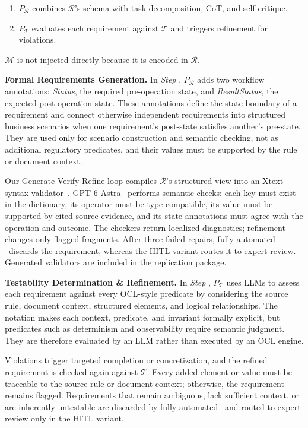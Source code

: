 \begin{enumerate}[leftmargin=*,align=left, itemsep=0pt, parsep=0pt, nosep]
    \item $P_\mathcal{R}$ combines $\mathcal{R}$'s schema with task
    decomposition, CoT, and self-critique.
    \item $P_\mathcal{T}$ evaluates each requirement against $\mathcal{T}$ and
    triggers refinement for violations.
\end{enumerate}
$\mathcal{M}$ is not injected directly because it is encoded in $\mathcal{R}$.


\noindent
\textbf{Formal Requirements Generation.}
In \textit{Step} , $P_\mathcal{R}$ adds two workflow annotations:
\textit{Status}, the required pre-operation state, and \textit{ResultStatus},
the expected post-operation state. These annotations define the state boundary
of a requirement and connect otherwise independent requirements into structured
business scenarios when one requirement's post-state satisfies another's
pre-state. They are used only for scenario construction and semantic checking,
not as additional regulatory predicates, and their values must be supported by
the rule or document context.

Our Generate-Verify-Refine loop compiles $\mathcal{R}$'s structured view into
an Xtext syntax validator~\cite{eysholdt2010xtext}. GPT-6-Astra~\cite{gpt}
performs semantic checks: each key must exist in the dictionary, its operator
must be type-compatible, its value must be supported by cited source evidence,
and its state annotations must agree with the operation and outcome. The
checkers return localized diagnostics; refinement changes only flagged
fragments. After three failed repairs, fully automated \ourtool\ discards the
requirement, whereas the HITL variant routes it to expert review. Generated
validators are included in the replication package.




\noindent
\textbf{Testability Determination \& Refinement.}
In \textit{Step} , $P_\mathcal{T}$ uses LLMs to assess each
requirement against every OCL-style predicate by considering the source rule,
document context, structured elements, and logical relationships. The notation
makes each context, predicate, and invariant formally explicit, but predicates
such as determinism and observability require semantic judgment. They are
therefore evaluated by an LLM rather than executed by an OCL engine.

Violations trigger targeted completion or concretization, and the
refined requirement is checked again against $\mathcal{T}$. Every added element
or value must be traceable to the source rule or document context; otherwise,
the requirement remains flagged. Requirements that remain ambiguous, lack
sufficient context, or are inherently untestable are discarded by fully
automated \ourtool\ and routed to expert review only in the HITL variant.





